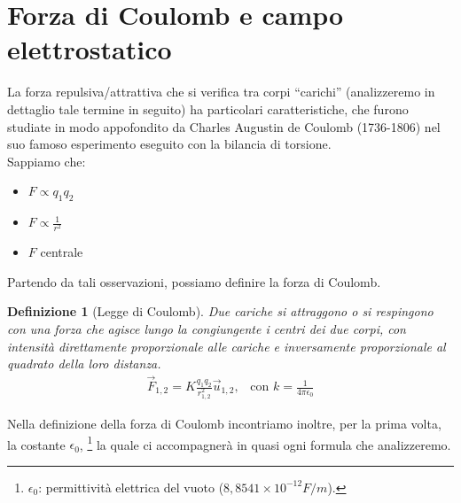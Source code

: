 \documentclass[a4paper,12pt,titlepage,openany]{book}
\theoremstyle{mydef}
\newtheorem{definizione}{Definizione}[chapter]
\begin{document}
        \section{Forza di Coulomb e campo elettrostatico}
            La forza repulsiva/attrattiva che si verifica tra corpi ``carichi'' (analizzeremo in dettaglio tale
            termine in seguito) ha particolari caratteristiche, che furono studiate in modo appofondito da Charles
            Augustin de Coulomb (1736-1806) nel suo famoso esperimento eseguito con la bilancia di torsione.\\
            Sappiamo che:
            \begin{itemize}
                \item $F \propto q_1q_2$
                \item $F \propto \frac{1}{r^2}$
                \item $F$ centrale
            \end{itemize}
            Partendo da tali osservazioni, possiamo definire la forza di Coulomb.
            \begin{definizione}[Legge di Coulomb]
                Due cariche si attraggono o si respingono con una forza che agisce lungo la congiungente i centri
                dei due corpi, con intensità direttamente proporzionale alle cariche e inversamente proporzionale
                al quadrato della loro distanza.
                \begin{align}
                    \vec{F}_{1,2}=K\frac{q_1q_2}{r_{1,2}^2} \vec{u}_{1,2}\text{,}\quad
                    \text{con } k=\frac{1}{4\pi\epsilon_0}
                \end{align}
            \end{definizione}
            \noindent
            Nella definizione della forza di Coulomb incontriamo inoltre, per la prima volta, la costante $\epsilon_0$,
            \footnote{$\epsilon_0$: permittività elettrica del vuoto ($8,8541\times 10^{-12}F/m$).} la quale ci 
            accompagnerà in quasi ogni formula che analizzeremo.
            
\end{document}
